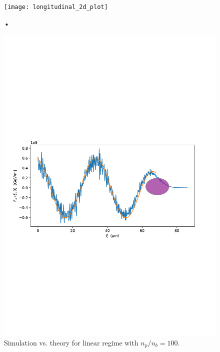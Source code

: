 \begin{figure}
\centering
\texttt{[image: longitudinal\_2d\_plot]}
\label{transverse_plot}
\caption{•}
\end{figure}
\begin{figure}
\includegraphics[width=\textwidth]{linear_SimVsTheory_bunch.pdf}
\caption{Simulation vs. theory for linear regime with $n_p/n_b=100$. }
\label{theory_vs_simulation}
\end{figure}
